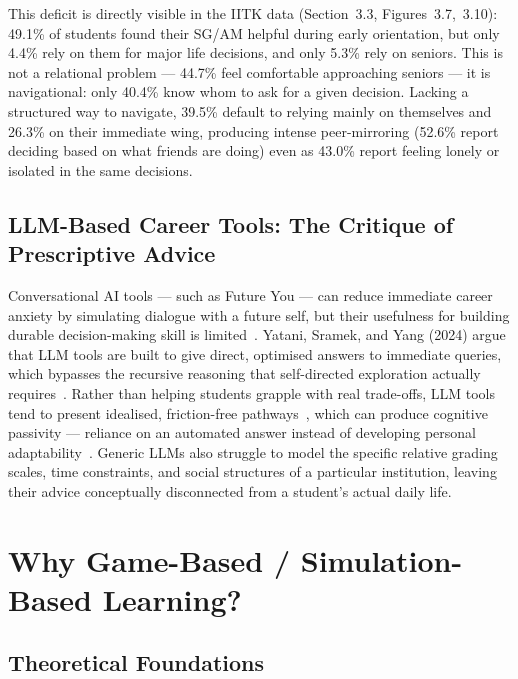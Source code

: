 This deficit is directly visible in the IITK data (Section~3.3, Figures~3.7,~3.10): 49.1\% of students found their SG/AM helpful during early orientation, but only 4.4\% rely on them for major life decisions, and only 5.3\% rely on seniors. This is not a relational problem --- 44.7\% feel comfortable approaching seniors --- it is navigational: only 40.4\% know whom to ask for a given decision. Lacking a structured way to navigate, 39.5\% default to relying mainly on themselves and 26.3\% on their immediate wing, producing intense peer-mirroring (52.6\% report deciding based on what friends are doing) even as 43.0\% report feeling lonely or isolated in the same decisions.

\subsection{LLM-Based Career Tools: The Critique of Prescriptive Advice}

Conversational AI tools --- such as Future You --- can reduce immediate career anxiety by simulating dialogue with a future self, but their usefulness for building durable decision-making skill is limited~\cite{Pataranutaporn-2024, Savickas-2013}. Yatani, Sramek, and Yang (2024) argue that LLM tools are built to give direct, optimised answers to immediate queries, which bypasses the recursive reasoning that self-directed exploration actually requires~\cite{Yatani-2024}. Rather than helping students grapple with real trade-offs, LLM tools tend to present idealised, friction-free pathways~\cite{Du-2024}, which can produce cognitive passivity --- reliance on an automated answer instead of developing personal adaptability~\cite{Yatani-2024, Du-2024}. Generic LLMs also struggle to model the specific relative grading scales, time constraints, and social structures of a particular institution, leaving their advice conceptually disconnected from a student's actual daily life.

\section{Why Game-Based / Simulation-Based Learning?}

\subsection{Theoretical Foundations}

